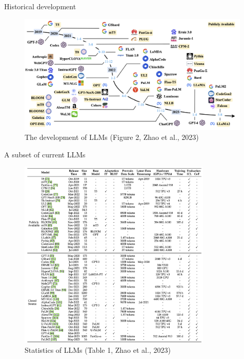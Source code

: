 \documentclass[10pt]{beamer}
\begin{document}
\begin{frame}{Historical development}

\begin{figure}[h]
\centering
\includegraphics[width=0.99\textwidth]{fig/fig2_zhao_2023}
\caption{The development of LLMs (Figure 2, Zhao et al., 2023)}
\end{figure}


\end{frame}

\begin{frame}{A subset of current LLMs}

\begin{figure}[h]
\centering
\includegraphics[width=0.82\textwidth]{fig/tab1_zhao_2023}
\caption{Statistics of LLMs (Table 1, Zhao et al., 2023)}
\end{figure}

\end{frame}
\end{document}
